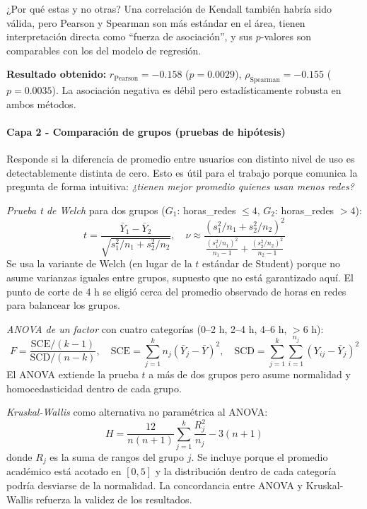 \documentclass[12pt]{article}
\begin{document}
¿Por qué estas y no otras? Una correlación de Kendall también habría sido válida, pero Pearson y Spearman son más estándar en el área, tienen interpretación directa como ``fuerza de asociación'', y sus \(p\)-valores son comparables con los del modelo de regresión.

\textbf{Resultado obtenido:} \(r_{\text{Pearson}} = -0.158\) (\(p = 0.0029\)), \(\rho_{\text{Spearman}} = -0.155\) (\(p = 0.0035\)). La asociación negativa es débil pero estadísticamente robusta en ambos métodos.

\paragraph{Capa 2 - Comparación de grupos (pruebas de hipótesis)}

Responde si la diferencia de promedio entre usuarios con distinto nivel de uso es detectablemente distinta de cero. Esto es útil para el trabajo porque comunica la pregunta de forma intuitiva: \textit{¿tienen mejor promedio quienes usan menos redes?}

\textit{Prueba t de Welch} para dos grupos (\(G_1\): horas\_redes \(\leq 4\), \(G_2\): horas\_redes \(> 4\)):
\[
t = \frac{\bar{Y}_1 - \bar{Y}_2}{\sqrt{s_1^2/n_1 + s_2^2/n_2}}, \quad \nu \approx \frac{(s_1^2/n_1 + s_2^2/n_2)^2}{\frac{(s_1^2/n_1)^2}{n_1-1} + \frac{(s_2^2/n_2)^2}{n_2-1}}
\]
Se usa la variante de Welch (en lugar de la \(t\) estándar de Student) porque no asume varianzas iguales entre grupos, supuesto que no está garantizado aquí. El punto de corte de 4 h se eligió cerca del promedio observado de horas en redes para balancear los grupos.

\textit{ANOVA de un factor} con cuatro categorías (0–2 h, 2–4 h, 4–6 h, \(>6\) h):
\[
F = \frac{\text{SCE}/(k-1)}{\text{SCD}/(n-k)}, \quad \text{SCE} = \sum_{j=1}^{k} n_j(\bar{Y}_j - \bar{Y})^2, \quad \text{SCD} = \sum_{j=1}^{k}\sum_{i=1}^{n_j}(Y_{ij} - \bar{Y}_j)^2
\]
El ANOVA extiende la prueba \(t\) a más de dos grupos pero asume normalidad y homocedasticidad dentro de cada grupo.

\textit{Kruskal-Wallis} como alternativa no paramétrica al ANOVA:
\[
H = \frac{12}{n(n+1)} \sum_{j=1}^{k} \frac{R_j^2}{n_j} - 3(n+1)
\]
donde \(R_j\) es la suma de rangos del grupo \(j\). Se incluye porque el promedio académico está acotado en \([0, 5]\) y la distribución dentro de cada categoría podría desviarse de la normalidad. La concordancia entre ANOVA y Kruskal-Wallis refuerza la validez de los resultados.
\end{document}
